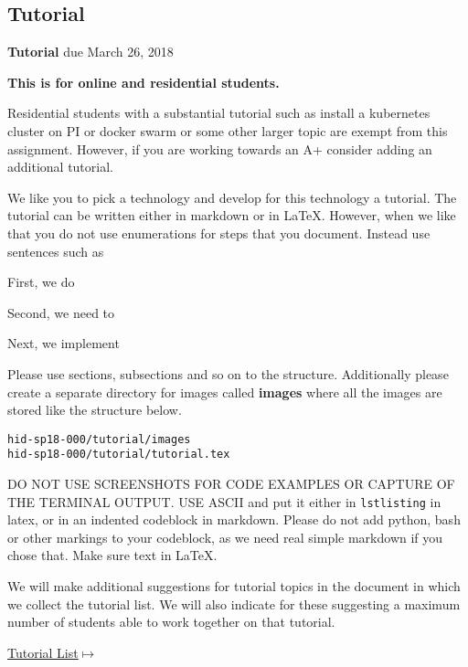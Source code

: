 \subsection{Tutorial}
\label{E:616-tutorial}

\begin{exercise} {\bf Tutorial} due March 26, 2018

{\bf This is for online and residential students.}

Residential students with a substantial tutorial such as install a
kubernetes cluster on PI or docker swarm or some other larger topic
are exempt from this assignment. However, if you are working towards
an A+ consider adding an additional tutorial.

 
We like you to pick a technology and develop for this technology a
tutorial. The tutorial can be written either in markdown or in
LaTeX. However, when we like that you do not use enumerations for
steps that you document. Instead use sentences such as
 
First, we do 
 
Second, we need to
 
Next, we implement
 
Please use sections, subsections and so on to the
structure. Additionally please create a separate directory for images
called {\bf images} where all the images are stored like the structure
below. 

\begin{lstlisting}
hid-sp18-000/tutorial/images
hid-sp18-000/tutorial/tutorial.tex
\end{lstlisting}
 
DO NOT USE SCREENSHOTS FOR CODE EXAMPLES OR CAPTURE OF THE TERMINAL
OUTPUT.  USE ASCII and put it either in \verb|lstlisting| in latex, or in an
indented codeblock in markdown. Please do not add python, bash or
other markings to your codeblock, as we need real simple markdown if
you chose that. Make sure text in LaTeX.

 
We will make additional suggestions for tutorial topics in the
document in which we collect the tutorial list. We will also indicate
for these suggesting a maximum number of students able to work
together on that tutorial.

{\hfill
  \href{https://docs.google.com/document/d/1L2-wYc7S7hb5u6ZNtKpTvlXqKMkqq-B38hlaBCw-eww/edit?usp=sharing}{Tutorial
    List$\mapsto$}}



\end{exercise} 


